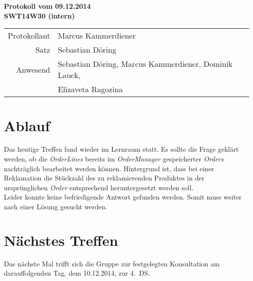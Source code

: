 \documentclass{scrartcl}
\begin{document}
\begin{center}
\LARGE \bf{Protokoll vom 09.12.2014 \\
SWT14W30 (intern)}
\end{center}

\begin{tabular}{rp{10cm}}
Protokollant & Marcus Kammerdiener \\
Satz & Sebastian Döring \\
Anwesend & Sebastian Döring, Marcus Kammerdiener, Dominik Lauck,\\
& Elizaveta Ragozina \\
\end{tabular}

\vspace*{3em}

\section{Ablauf}
Das heutige Treffen fand wieder im Lernraum statt. Es sollte die Frage geklärt werden, ob die \textit{OrderLines} bereits im \textit{OrderManager} gespeicherter \textit{Orders} nachträglich bearbeitet werden können. Hintergrund ist, dass bei einer Reklamation die Stückzahl des zu reklamierenden Produktes in der ursprünglichen \textit{Order} entsprechend heruntergesetzt werden soll.\\
Leider konnte keine befriedigende Antwort gefunden werden. Somit muss weiter nach einer Lösung gesucht werden.

\vspace*{1em}

\section{N\"achstes Treffen}
Das nächste Mal trifft sich die Gruppe zur festgelegten Konsultation am darauffolgenden Tag, dem 10.12.2014, zur 4.~DS.
\end{document}
